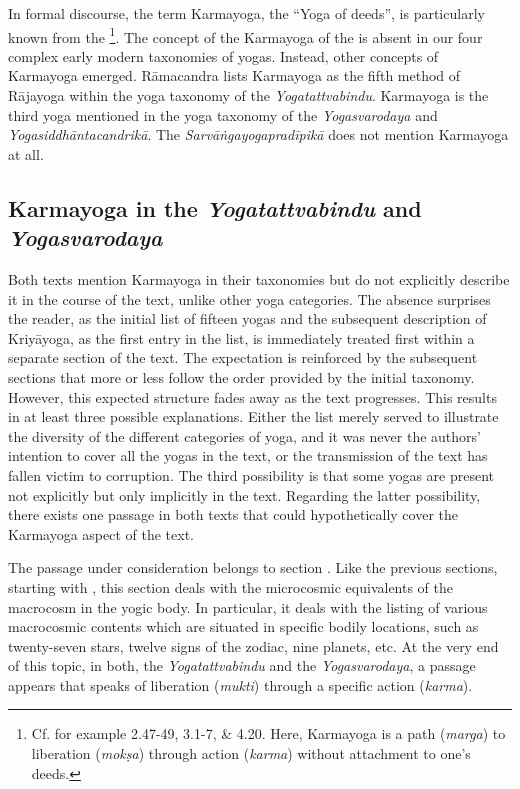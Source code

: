 In formal discourse, the term Karmayoga, the ``Yoga of deeds'', is particularly known from the \footnote{Cf. for example  2.47-49, 3.1-7, \& 4.20. Here, Karmayoga is a path (\textit{marga}) to liberation (\textit{mokṣa}) through action (\textit{karma}) without attachment to one's deeds.}. The concept of the Karmayoga of the  is absent in our four complex early modern taxonomies of yogas. Instead, other concepts of Karmayoga emerged. Rāmacandra lists Karmayoga as the fifth method of Rājayoga within the yoga taxonomy of the \textit{Yogatattvabindu}. Karmayoga is the third yoga mentioned in the yoga taxonomy of the \textit{Yogasvarodaya} and \textit{Yogasiddhāntacandrikā}. The \textit{Sarvāṅgayogapradīpikā} does not mention Karmayoga at all.  

\subsection{Karmayoga in the \textit{Yogatattvabindu} and \textit{Yogasvarodaya}}

Both texts mention Karmayoga in their taxonomies but do not explicitly describe it in the course of the text, unlike other yoga categories. The absence surprises the reader, as the initial list of fifteen yogas and the subsequent description of Kriyāyoga, as the first entry in the list, is immediately treated first within a separate section of the text. The expectation is reinforced by the subsequent sections that more or less follow the order provided by the initial taxonomy. However, this expected structure fades away as the text progresses. This results in at least three possible explanations. Either the list merely served to illustrate the diversity of the different categories of yoga, and it was never the authors' intention to cover all the yogas in the text, or the transmission of the text has fallen victim to corruption. The third possibility is that some yogas are present not explicitly but only implicitly in the text. Regarding the latter possibility, there exists one passage in both texts that could hypothetically cover the Karmayoga aspect of the text.

The passage under consideration belongs to section . Like the previous sections, starting with , this section deals with the microcosmic equivalents of the macrocosm in the yogic body. In particular, it deals with the listing of various macrocosmic contents which are situated in specific bodily locations, such as twenty-seven stars, twelve signs of the zodiac, nine planets, etc. At the very end of this topic, in both, the \textit{Yogatattvabindu} and the \textit{Yogasvarodaya}, a passage appears that speaks of liberation (\textit{mukti}) through a specific action (\textit{karma}).

